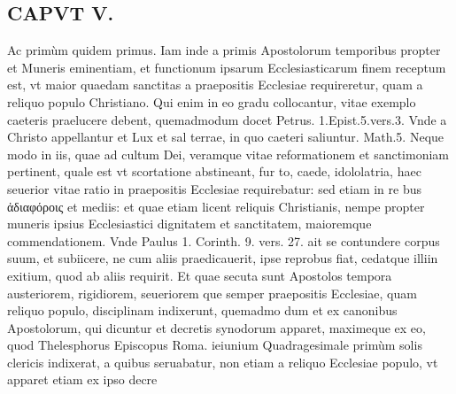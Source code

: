 \documentclass{article}
\begin{document}
\begin{pages}
\section*{CAPVT  V. }
\marginpar{[ p.371 ]}\pstart Ac primùm quidem primus.  \pend\pstart Iam inde a primis Apostolorum temporibus propter et Muneris eminentiam, et functionum ipsarum Ecclesiasticarum finem receptum est, vt maior quaedam sanctitas a praepositis Ecclesiae requireretur, quam a reliquo populo Christiano. Qui enim in eo gradu collocantur, vitae exemplo caeteris praelucere debent, quemadmodum docet Petrus. 1.Epist.5.vers.3. Vnde a Christo appellantur et Lux et sal terrae, in quo caeteri saliuntur. Math.5. Neque modo in iis, quae ad cultum Dei, veramque vitae reformationem et sanctimoniam pertinent, quale est vt scortatione abstineant, fur to, caede, idololatria, haec seuerior vitae ratio in praepositis Ecclesiae requirebatur: sed etiam in re bus ἀδιαφόροις et mediis: et quae etiam licent reliquis Christianis, nempe propter muneris ipsius Ecclesiastici dignitatem et sanctitatem, maioremque commendationem. Vnde Paulus 1. Corinth. 9. vers. 27. ait se contundere corpus suum, et subiicere, ne cum aliis praedicauerit, ipse reprobus fiat, cedatque illiin exitium, quod ab aliis requirit. Et quae secuta sunt Apostolos tempora austeriorem, rigidiorem, seueriorem que semper praepositis Ecclesiae, quam reliquo populo, disciplinam indixerunt, quemadmo dum et ex canonibus Apostolorum, qui dicuntur et decretis synodorum apparet, maximeque ex eo, quod Thelesphorus Episcopus Roma. ieiunium Quadragesimale primùm solis clericis indixerat, a quibus seruabatur, non etiam a reliquo Ecclesiae populo, vt apparet etiam ex ipso decre\pend

\end{pages}
\end{document}
